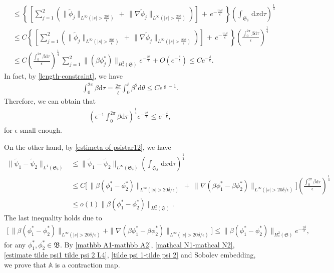 \documentclass[10pt, reqno]{amsart}
\numberwithin{equation}{section}
\theoremstyle{definition}
\def\lf{\left}
\def\ri{\right}
\begin{document}
{\begin{align}
 & \leq
\left\{ \,\lf[ \sum_{j =1}^2\left(\| \tilde\phi_j\|_{L^{\infty}(|s|>\frac{20\delta}{\epsilon})}\,+\, \|\nabla \tilde\phi_j \|_{L^{\infty}(|s|>\frac{20\delta}{\epsilon})} \right)\ri]\,+\,
e^{-\frac{ \upsilon_2 \delta}{\epsilon}} \,\right\}
\left( \int_{\mathfrak S_\delta} \,{\mathrm d}x {\mathrm d}\tau\right)^{\frac14}
\nonumber
 \\[2mm]
 & \leq C\left\{ \,\lf[ \sum_{j =1}^2\left(\| \tilde\phi_j\|_{L^{\infty}(|s|>\frac{20\delta}{\epsilon})}\,+\, \|\nabla \tilde\phi_j \|_{L^{\infty}(|s|>\frac{20\delta}{\epsilon})} \right)\ri]\,+\,
e^{-\frac{ \upsilon_2 \delta}{\epsilon}} \,\right\}\left( \frac{\int_0^{2\pi} \beta {\mathrm d}\tau} {\epsilon} \right)^{\frac14}
\nonumber
 \\[2mm]
 & \leq C\left( \frac{\int_0^{2\pi} \beta {\mathrm d}\tau} {\epsilon} \right)^{\frac14}
 \,\sum_{j=1}^2\|\left(\beta\phi_j^*\right)\|_{H^2_*(\mathfrak S)} e^{-\frac{2\delta} \epsilon} + O(e^{-\frac{\delta}{\epsilon}})
 \leq C e^{-\frac{\delta}{\epsilon}}.
\end{align}
 In fact, by \eqref{length-constraint}, we have
\begin{align*}
 \int_0^{2\pi} \beta {\mathrm d}\tau = \frac{2\pi} {\tilde\ell}\int_0^{\ell} \beta^2 {\mathrm d}\theta \leq C \epsilon^{\varrho-1}.
\end{align*}
Therefore, we can obtain that
\begin{align*}
\left(  {\epsilon}^{-1}{\int_0^{2\pi} \beta {\mathrm d}\tau} \right)^{\frac14} e^{-\frac{2\delta} \epsilon} \leq e^{-\frac{\delta} \epsilon},
\end{align*}
 for $\epsilon$ small enough.


On the other hand, by \eqref{estimeta of psistar12}, we have
\begin{align}\label{tilde psi 1-tilde psi 2}
\|\tilde\psi_1- \tilde\psi_2\|_{L^4(\mathfrak S_\delta)}
 & \leq \|\tilde\psi_1- \tilde\psi_2\|_{L^{\infty} (\mathfrak S_\delta)} \left( \int_{\mathfrak S_\delta} \,{\mathrm d}x {\mathrm d}\tau\right)^{\frac14}
\nonumber
 \\[2mm]
 & \leq C
 \Big[\, \|\beta\left({\phi}^*_1-{ \phi}^*_2\right)\|_{L^{\infty}(|s|>{20\delta}/\epsilon)}
 \ +\
 \|\nabla \left(\beta{\phi}^*_1-\beta{\phi}^*_2 \right) \|_{L^{\infty}(|s|>{20\delta}/\epsilon)}\Big]  \left( \frac{\int_0^{2\pi} \beta {\mathrm d}\tau} {\epsilon} \right)^{\frac14}
\nonumber
 \\[2mm]
 & \leq o(1) \|\beta\left({\phi}^*_1-{ \phi}^*_2\right)\|_{H^2_*(\mathfrak S)}.
\end{align}
 The last inequality holds due to
\begin{align*}
 \big[\, \|\beta\left({\phi}^*_1-{ \phi}^*_2\right)\|_{L^{\infty}(|s|>{20\delta}/\epsilon)}+\|\nabla \left(\beta{\phi}^*_1-\beta{\phi}^*_2 \right) \|_{L^{\infty}(|s|>{20\delta}/\epsilon)}\big] \leq \|\beta\left({\phi}^*_1-{ \phi}^*_2\right)\|_{H^2_*(\mathfrak S)} e^{-\frac{2\delta} \epsilon},
\end{align*}
 for any ${\phi}^*_1, {\phi}^*_2 \in \mathfrak B.$
 By \eqref{mathbb A1-mathbb A2}, \eqref{mathcal N1-mathcal N2}, \eqref{estimate tilde psi1 tilde psi 2 L4}, \eqref{tilde psi 1-tilde psi 2} and Sobolev embedding, we prove that $\mathbb{A}$ is a contraction map.


}
\end{document}
